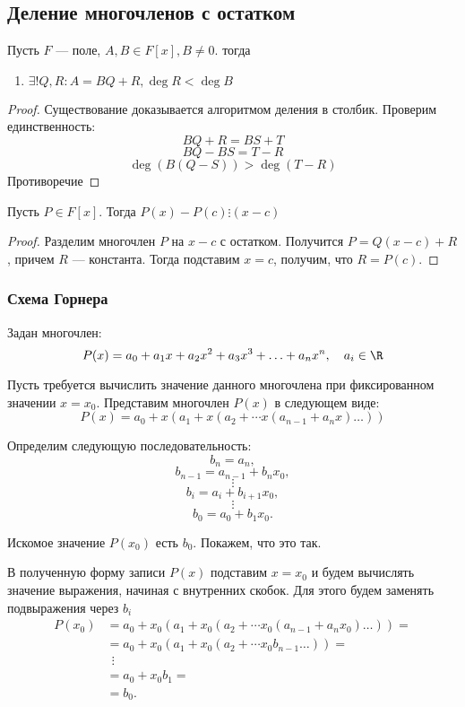 \subsection{Деление многочленов с остатком}
\begin{theorem}
    Пусть \(F\) --- поле, \(A, B \in F[x], B \ne 0\). тогда
    \begin{enumerate}
        \item \(\exists! Q, R: A = BQ + R, \deg R < \deg B\)
    \end{enumerate}
\end{theorem}
\begin{proof}
    Существование доказывается алгоритмом деления в столбик. Проверим единственность:
    \[BQ + R = BS + T\]
    \[BQ - BS = T - R\]
    \[\deg (B(Q - S)) > \deg(T - R)\]
    Противоречие
\end{proof}

\begin{theorem}[Безу]
    Пусть \(P \in F[x]\). Тогда \(P(x) - P(c) \vdots (x - c)\)
\end{theorem}
\begin{proof}
    Разделим многочлен \(P\) на \(x - c\) с остатком. Получится \(P = Q(x - c) + R\), причем \(R\) --- константа. Тогда подставим \(x = c\), получим, что \(R = P(c)\).
\end{proof}

\subsubsection{Схема Горнера}
Задан многочлен:
\[P(x) = a_0 + a_1 x + a_2 x^2 + a_3 x^3 + \ldots + a_n x^n, \quad a_i \in \R\]

Пусть требуется вычислить значение данного многочлена при фиксированном значении \(x = x_0\). Представим многочлен \(P(x)\) в следующем виде:
\[P(x) = a_0 + x(a_1 + x(a_2 + \cdots x(a_{n-1} + a_n x) \dots))\]

Определим следующую последовательность:
\[b_n = a_n,\]
\[b_{n-1} = a_{n-1} + b_n x_0,\]
\[\vdots\]
\[b_i = a_i + b_{i+1} x_0,\]
\[\vdots\]
\[b_0 = a_0 + b_1 x_0.\]

Искомое значение \(P(x_0)\) есть \(b_0\). Покажем, что это так.

В полученную форму записи \(P(x)\) подставим \(x = x_0\) и будем вычислять значение выражения, начиная с внутренних скобок. Для этого будем заменять подвыражения через \(b_i\)
\[
\begin{array}{ll}
 P(x_0) & = a_0 + x_0(a_1 + x_0(a_2 + \cdots x_0(a_{n-1} + a_n x_0)\dots)) = \\
  & = a_0 + x_0(a_1 + x_0(a_2 + \cdots x_0 b_{n-1}\dots)) = \\
  & ~~ \vdots \\
  & = a_0 + x_0 b_1 = \\
  & = b_0.
\end{array}
\]
